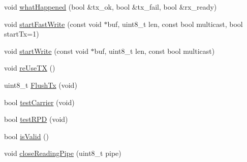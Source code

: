 \begin{DoxyCompactItemize}
void \hyperlink{classNRF24L01_ad98d10f3759d41e565397aba824d121b}{what\+Happened} (bool \&tx\+\_\+ok, bool \&tx\+\_\+fail, bool \&rx\+\_\+ready)
\item 
void \hyperlink{classNRF24L01_ab1ca9025a8740bc38ad5dd7a427e2d4f}{start\+Fast\+Write} (const void $\ast$buf, uint8\+\_\+t len, const bool multicast, bool start\+Tx=1)
\item 
void \hyperlink{classNRF24L01_a282e44fa8d6ec7542e9d725cf048f6b2}{start\+Write} (const void $\ast$buf, uint8\+\_\+t len, const bool multicast)
\item 
void \hyperlink{classNRF24L01_ad0797d9c6f8ecd9619c9e48168571a01}{re\+Use\+TX} ()
\item 
uint8\+\_\+t \hyperlink{classNRF24L01_ab40eeb5ca2337c5f15992f29ee3b5b18}{Flush\+Tx} (void)
\item 
bool \hyperlink{classNRF24L01_a5e934f8f7d37245264ad16e3c360eca7}{test\+Carrier} (void)
\item 
bool \hyperlink{classNRF24L01_abf1d84ed988aa6c7925ebb712b7c7f60}{test\+R\+PD} (void)
\item 
bool \hyperlink{classNRF24L01_aaddabe35ed60f03a2fb2fb475a3cafb5}{is\+Valid} ()
\item 
void \hyperlink{classNRF24L01_a7214eaa3fcd3b6576d8f290e6ab71955}{close\+Reading\+Pipe} (uint8\+\_\+t pipe)
\end{DoxyCompactItemize}

